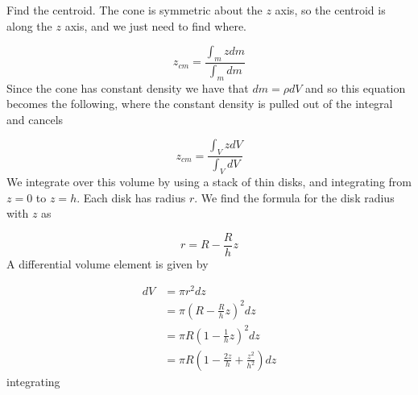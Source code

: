 \begin{example}[Cone]
  \begin{center}
  \end{center}
  Find the centroid.
  The cone is symmetric about the $z$ axis, so the centroid is along the $z$ axis, and we just need to find where.

  \begin{equation*}
    z_{cm}=\frac{\int_{m}zdm}{\int_{m}dm}
  \end{equation*}
  Since the cone has constant density we have that $dm=\rho dV$ and so this equation becomes the following, where the constant density is pulled out of the integral and cancels

  \begin{equation*}
    z_{cm}=\frac{\int_{V}zdV}{\int_{V}dV}
  \end{equation*}
  We integrate over this volume by using a stack of thin disks, and integrating from $z=0$ to $z=h$.
  Each disk has radius $r$.
  We find the formula for the disk radius with $z$ as

  \begin{equation*}
    r=R-\frac{R}{h}z
  \end{equation*}
  A differential volume element is given by

  \begin{equation*}
    \begin{split}
      dV&=\pi r^{2}dz \\
      &=\pi\left(R-\frac{R}{h}z\right)^{2}dz \\
      &=\pi R\left(1-\frac{1}{h}z\right)^{2}dz \\
      &=\pi R\left(1-\frac{2z}{h}+\frac{z^{2}}{h^{2}}\right)dz
    \end{split}
  \end{equation*}
  integrating
\end{example}


